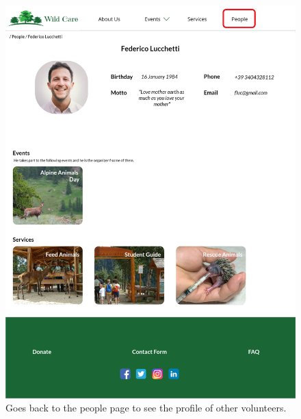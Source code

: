 	\begin{figure}[h!]
		\centering
		\begin{minipage}[b]{1\textwidth}
    			\includegraphics[width=\textwidth]{./assets/mockups/persondetails_people.png}
			\caption{Goes back to the people page to see the profile of other volunteers.}
		\end{minipage}
	\end{figure}

